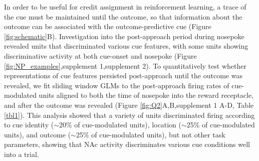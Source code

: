 \documentclass[11pt]{article}
\begin{document}
In order to be useful for credit assignment in reinforcement learning, a trace of the cue must be maintained until the outcome, so that information about the outcome can be associated with the outcome-predictive cue (Figure \ref{fig:schematic}B). Investigation into the post-approach period during nosepoke revealed units that discriminated various cue features, with some units showing discriminative activity at both cue-onset and nosepoke (Figure \ref{fig:NP_examples},supplement 1,supplement 2). To quantitatively test whether representations of cue features persisted post-approach until the outcome was revealed, we fit sliding window GLMs to the post-approach firing rates of cue-modulated units aligned to both the time of nosepoke into the reward receptacle, and after the outcome was revealed (Figure \ref{fig:Q2}A,B,supplement 1 A-D, Table \ref{tbl1}). This analysis showed that a variety of units discriminated firing according to cue identity ($\sim$20\% of cue-modulated units), location ($\sim$25\% of cue-modulated units), and outcome ($\sim$25\% of cue-modulated units), but not other task parameters, showing that NAc activity discriminates various cue conditions well into a trial.
\end{document}
